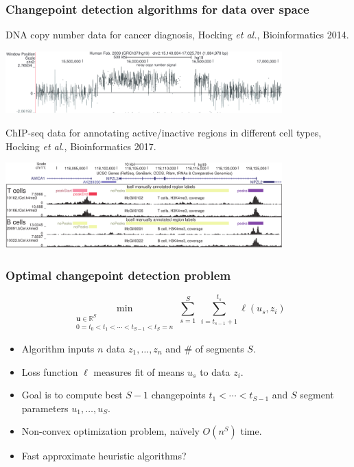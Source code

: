 \documentclass{beamer}
\newcommand{\RR}{\mathbb R}
\begin{document}
\begin{frame}
  \frametitle{Changepoint detection algorithms for data over space}

  DNA copy number data for cancer diagnosis, Hocking \emph{et
    al.}, Bioinformatics 2014.

  \includegraphics[width=0.8\textwidth]{intro-breakpoints}

  ChIP-seq data for annotating active/inactive regions in different cell types, Hocking 
  \emph{et al.}, Bioinformatics 2017.

  \includegraphics[width=0.8\textwidth]{intro-peaks}

\end{frame}

\begin{frame}
  \frametitle{Optimal changepoint detection problem}
  
  \vskip -1cm    
$$
\min_{\substack{
  \mathbf u\in\RR^{S}
\\
   0=t_0<t_1<\cdots<t_{S-1}<t_S=n
  }} 
    \sum_{s=1}^S\  \sum_{i=t_{s-1}+1}^{t_s} \ell( u_s,  z_i) 
$$
\begin{itemize}
  \item Algorithm inputs $n$ data $z_1, \dots, z_n$ and \# of segments $S$.
  \item Loss function $\ell$ measures fit of means $u_s$ to data $z_i$.
  \item Goal is to compute best $S-1$ changepoints
    $t_1 < \cdots < t_{S-1}$ and $S$ segment parameters $u_1,\dots,u_S$.
  \item Non-convex optimization problem, na\" ively $O(n^S)$ time.
  \item Fast approximate heuristic algorithms?
  \end{itemize}
\end{frame}
\end{document}
